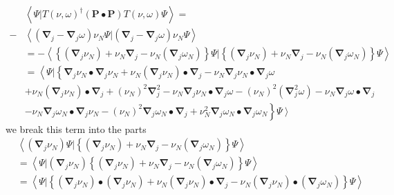 \documentclass[aps,preprint]{revtex4}%
\begin{document}
\begin{align*}
&  \left\langle \Psi|T\left(  \nu,\omega\right)  ^{\dagger}\left(
\mathbf{P\bullet P}\right)  T\left(  \nu,\omega\right)  \Psi\right\rangle =\\
- &  \left\langle \left(  \mathbf{\nabla}_{j}-\mathbf{\nabla}_{j}%
\omega\right)  \nu_{N}\Psi|\left(  \mathbf{\nabla}_{j}-\mathbf{\nabla}%
_{j}\omega\right)  \nu_{N}\Psi\right\rangle \\
&  =-\left\langle \left\{  \left(  \mathbf{\nabla}_{j}\nu_{N}\right)  +\nu
_{N}\mathbf{\nabla}_{j}-\nu_{N}\left(  \mathbf{\nabla}_{j}\omega_{N}\right)
\right\}  \Psi|\left\{  \left(  \mathbf{\nabla}_{j}\nu_{N}\right)  +\nu
_{N}\mathbf{\nabla}_{j}-\nu_{N}\left(  \mathbf{\nabla}_{j}\omega_{N}\right)
\right\}  \Psi\right\rangle \\
&  =\left\langle \Psi|\left\{  \mathbf{\nabla}_{j}\nu_{N}\bullet
\mathbf{\nabla}_{j}\nu_{N}+\nu_{N}\left(  \mathbf{\nabla}_{j}\nu_{N}\right)
\bullet\mathbf{\nabla}_{j}-\nu_{N}\mathbf{\nabla}_{j}\nu_{N}\bullet
\mathbf{\nabla}_{j}\omega\right.  \right.  \\
&  +\nu_{N}\left(  \mathbf{\nabla}_{j}\nu_{N}\right)  \bullet\mathbf{\nabla
}_{j}+\left(  \nu_{N}\right)  ^{2}\mathbf{\nabla}_{j}^{2}-\nu_{N}%
\mathbf{\nabla}_{j}\nu_{N}\bullet\mathbf{\nabla}_{j}\omega-\left(  \nu
_{N}\right)  ^{2}\left(  \mathbf{\nabla}_{j}^{2}\omega\right)  -\nu
_{N}\mathbf{\nabla}_{j}\omega\bullet\mathbf{\nabla}_{j}\\
&  \left.  -\nu_{N}\mathbf{\nabla}_{j}\omega_{N}\bullet\mathbf{\nabla}_{j}%
\nu_{N}-\left(  \nu_{N}\right)  ^{2}\mathbf{\nabla}_{j}\omega_{N}%
\bullet\mathbf{\nabla}_{j}+\nu_{N}^{2}\mathbf{\nabla}_{j}\omega_{N}%
\bullet\mathbf{\nabla}_{j}\omega_{N}\right\}  \left.  \Psi\right\rangle
\end{align*}
we break this term into the parts
\begin{align}
& \left\langle \left(  \mathbf{\nabla}_{j}\nu_{N}\right)  \Psi|\left\{
\left(  \mathbf{\nabla}_{j}\nu_{N}\right)  +\nu_{N}\mathbf{\nabla}_{j}-\nu
_{N}\left(  \mathbf{\nabla}_{j}\omega_{N}\right)  \right\}  \Psi\right\rangle
\nonumber\\
& =\left\langle \Psi|\left(  \mathbf{\nabla}_{j}\nu_{N}\right)  \left\{
\left(  \mathbf{\nabla}_{j}\nu_{N}\right)  +\nu_{N}\mathbf{\nabla}_{j}-\nu
_{N}\left(  \mathbf{\nabla}_{j}\omega_{N}\right)  \right\}  \Psi\right\rangle
\nonumber\\
& =\left\langle \Psi|\left\{  \left(  \mathbf{\nabla}_{j}\nu_{N}\right)
\bullet\left(  \mathbf{\nabla}_{j}\nu_{N}\right)  +\nu_{N}\left(
\mathbf{\nabla}_{j}\nu_{N}\right)  \bullet\mathbf{\nabla}_{j}-\nu_{N}\left(
\mathbf{\nabla}_{j}\nu_{N}\right)  \bullet\left(  \mathbf{\nabla}_{j}%
\omega_{N}\right)  \right\}  \Psi\right\rangle
\end{align}%
\end{document}
